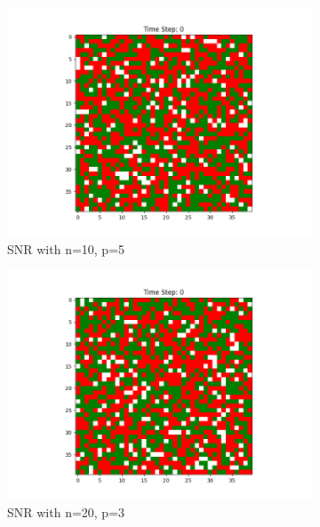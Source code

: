 \documentclass[11pt]{article}
\begin{document}
\begin{figure}[h]
\begin{subfigure}{0.14\textwidth}
			\includegraphics[width=\linewidth]{initial_social_n10p5.png}
			\caption{\centering SNR with n=10, p=5}
		\end{subfigure}\hfill
		\begin{subfigure}{0.14\textwidth}
			\includegraphics[width=\linewidth]{initial_social_n20p3.png}
			\caption{\centering SNR with n=20, p=3}
		\end{subfigure}\hfill
		\begin{subfigure}{0.14\textwidth}

\end{subfigure}
\end{figure}
\end{document}
